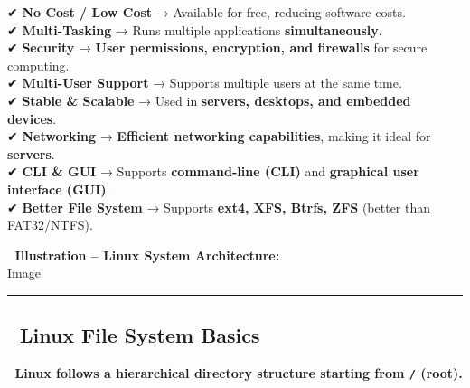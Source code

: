 \documentclass[
]{article}
\begin{document}
✔ \textbf{No Cost / Low Cost} → Available for free, reducing software
costs.\\
✔ \textbf{Multi-Tasking} → Runs multiple applications
\textbf{simultaneously}.\\
✔ \textbf{Security} → \textbf{User permissions, encryption, and
firewalls} for secure computing.\\
✔ \textbf{Multi-User Support} → Supports multiple users at the same
time.\\
✔ \textbf{Stable \& Scalable} → Used in \textbf{servers, desktops, and
embedded devices}.\\
✔ \textbf{Networking} → \textbf{Efficient networking capabilities},
making it ideal for \textbf{servers}.\\
✔ \textbf{CLI \& GUI} → Supports \textbf{command-line (CLI)} and
\textbf{graphical user interface (GUI)}.\\
✔ \textbf{Better File System} → Supports \textbf{ext4, XFS, Btrfs, ZFS}
(better than FAT32/NTFS).

📌 \textbf{Illustration -- Linux System Architecture:}\\
{Image}

\begin{center}\rule{0.5\linewidth}{0.5pt}\end{center}

\subsection{\texorpdfstring{\textbf{📌 Linux File System
Basics}}{📌 Linux File System Basics}}\label{linux-file-system-basics}

📌 \textbf{Linux follows a hierarchical directory structure starting
from \texttt{/} (root).}
\end{document}
